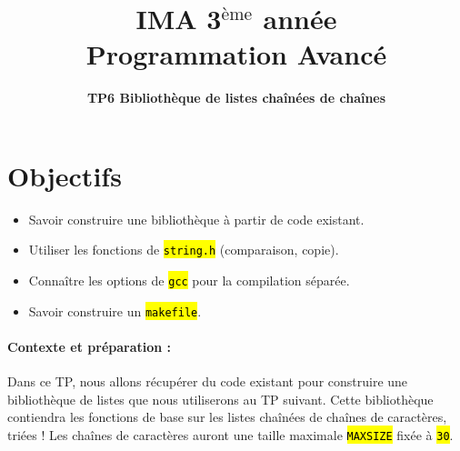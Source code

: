 \documentclass[final, a4paper, openbib, ]{article}
\title{IMA 3$^{\mbox{\`eme}}$ année\\ Programmation Avancé
}
\author{\huge \textbf{TP6 Bibliothèque de listes chaînées de chaînes}}
\date{}
\let\OldTexttt\texttt
\renewcommand{\texttt}[1]{\OldTexttt{\hl{#1}}}
\begin{document}
\posttitle{\par\end{center}}
\setlength{\droptitle}{-45pt}
\maketitle

\vspace{-1.7cm}
\section{Objectifs}

\begin{itemize}
	\item Savoir construire une bibliothèque à partir de code existant.
	\item Utiliser les fonctions de \texttt{string.h} (comparaison, copie).
	\item Connaître les options de \texttt{gcc} pour la compilation séparée.
	\item Savoir construire un \texttt{makefile}.
\end{itemize}


\paragraph{Contexte et préparation : } Dans ce TP, nous allons récupérer du code existant pour construire une
bibliothèque de listes que nous utiliserons au TP suivant. Cette bibliothèque contiendra les fonctions de base
sur les listes chaînées de chaînes de caractères, triées ! Les chaînes de caractères auront une taille
maximale \texttt{MAXSIZE} fixée à \texttt{30}.
\end{document}
